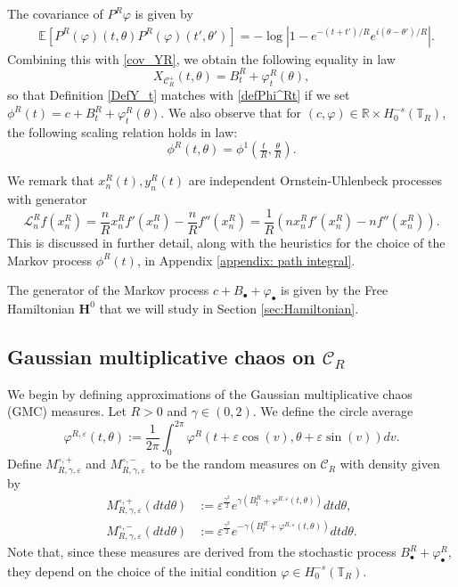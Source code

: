 \documentclass[11pt]{amsart}
\numberwithin{equation}{section}
\theoremstyle{definition}
\renewcommand{\H}{\mathbb{H}}
\def\H{\mathbf{H}}
\def\E{\mathbb{E}}
\newcommand{\mc}{\mathcal}
\def\eps{\varepsilon}
\begin{document}
The covariance of $P^R\varphi$ is given by 
\begin{align*}
& \E[P^R(\varphi)(t,\theta)P^R(\varphi)(t',\theta')]= -\log |1- e^{-(t+t')/R} e^{i (\theta-\theta')/R}|.
\end{align*}
Combining this with \eqref{cov_YR}, we obtain the following equality in law 
\[ X_{\mc{C}_R^+}(t,\theta)=B^R_{t}+ \varphi^R_t(\theta),\]
so that Definition \ref{DefY_t} matches with \eqref{defPhi^Rt} if we set $\phi^R(t)=c+B^R_{t}+ \varphi^R_t(\theta)$.
We also observe that for $(c,\varphi) \in \mathbb{R}\times H^{-s}_0(\mathbb{T}_R)$, the following scaling relation holds in law:
\begin{equation}\label{scalinrel} 
\phi^R(t, \theta)= \phi^1(\tfrac{t}{R}, \tfrac{\theta}{R}).
\end{equation}

We remark that $x_n^R(t),y_n^R(t)$ are independent Ornstein-Uhlenbeck processes with generator
\begin{equation*}
\mathcal{L}_n^R f(x^R_n)
=
\frac{n}{R} x^R_n f'(x^R_n)-\frac{n}{R} f''(x^R_n)= \frac{1}{R} ( n x^R_n f'(x^R_n)- n f''(x^R_n) ).
\end{equation*} 
This is discussed in further detail, along with the heuristics for the choice of the Markov process $\phi^R(t)$, in Appendix \ref{appendix: path integral}.

The generator of the Markov process $c+B_\bullet + \varphi_\bullet$ is given by the Free Hamiltonian  $\H^0$ that we will study in  Section \ref{sec:Hamiltonian}. 

 
\subsection{Gaussian multiplicative chaos on $\mc{C}_R$}

We begin by defining approximations of the Gaussian multiplicative chaos (GMC) measures.
Let $R>0$ and $\gamma \in (0,2)$. We define the circle average
\begin{equation}\label{circle_average}
\varphi^{R,\eps}(t, \theta):= \frac{1}{2 \pi} \int_0^{2\pi} \varphi^{R}(t+\eps \cos(v),\theta+\eps \sin(v))  dv.
\end{equation}
Define $M_{R,\gamma,\eps}^{\circ,+}$ and $M_{R,\gamma,\eps}^{\circ, -}$ to be the random measures on $\mc{C}_R$ with density given by 
\begin{align*}
M^{\circ,+}_{R,\gamma,\eps}(dtd\theta)
&:=
 \eps^{\frac{\gamma^2}{2}}e^{\gamma (B_t^R+\varphi^{R,\eps} (t,\theta))} dtd\theta,
\\
M^{\circ, -}_{R,\gamma,\eps}(dtd\theta)
&:= \eps^{\frac{\gamma^2}{2}}e^{-\gamma (B_t^R+\varphi^{R,\eps}(t,\theta))} dtd\theta.
\end{align*}
Note that, since these measures are derived from the stochastic process $B_\bullet^R + \varphi_\bullet^R$, they depend on the choice of the initial condition  $\varphi \in H^{-s}_0(\mathbb{T}_R)$. 
\end{document}
